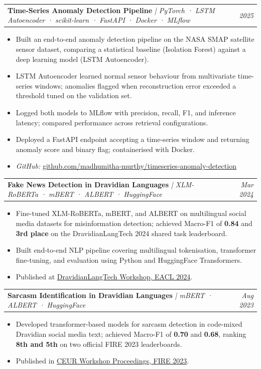 \documentclass[10pt, a4paper]{article}
\makeatletter
\newcommand{\projentry}[3]{%
    \noindent
    \begin{tabularx}{\textwidth}{@{}X r@{}}
        \textbf{#1} \textit{\small | #2} & \textit{#3}
    \end{tabularx}%
    \vspace{1pt}%
}
\newcommand{\entryspace}{\vspace{6pt}}
\makeatother
\begin{document}
\projentry{Time-Series Anomaly Detection Pipeline}{PyTorch · LSTM Autoencoder · scikit-learn · FastAPI · Docker · MLflow}{2025}
\begin{itemize}
    \item Built an end-to-end anomaly detection pipeline on the NASA SMAP satellite sensor dataset, comparing a statistical baseline (Isolation Forest) against a deep learning model (LSTM Autoencoder).
    \item LSTM Autoencoder learned normal sensor behaviour from multivariate time-series windows; anomalies flagged when reconstruction error exceeded a threshold tuned on the validation set.
    \item Logged both models to MLflow with precision, recall, F1, and inference latency; compared performance across retrieval configurations.
    \item Deployed a FastAPI endpoint accepting a time-series window and returning anomaly score and binary flag; containerised with Docker.
    \item \textit{GitHub:} \href{https://github.com/madhumitha-murthy/timeseries-anomaly-detection}{github.com/madhumitha-murthy/timeseries-anomaly-detection}
\end{itemize}

\entryspace

\projentry{Fake News Detection in Dravidian Languages}{XLM-RoBERTa · mBERT · ALBERT · HuggingFace}{Mar 2024}
\begin{itemize}
    \item Fine-tuned XLM-RoBERTa, mBERT, and ALBERT on multilingual social media datasets for misinformation detection; achieved Macro-F1 of \textbf{0.84} and \textbf{3rd place} on the DravidianLangTech 2024 shared task leaderboard.
    \item Built end-to-end NLP pipeline covering multilingual tokenisation, transformer fine-tuning, and evaluation using Python and HuggingFace Transformers.
    \item Published at \href{https://aclanthology.org/2024.dravidianlangtech-1.0}{DravidianLangTech Workshop, EACL 2024}.
\end{itemize}

\entryspace

\projentry{Sarcasm Identification in Dravidian Languages}{mBERT · ALBERT · HuggingFace}{Aug 2023}
\begin{itemize}
    \item Developed transformer-based models for sarcasm detection in code-mixed Dravidian social media text; achieved Macro-F1 of \textbf{0.70} and \textbf{0.68}, ranking \textbf{8th and 5th} on two official FIRE 2023 leaderboards.
    \item Published in \href{https://ceur-ws.org}{CEUR Workshop Proceedings, FIRE 2023}.
\end{itemize}
\end{document}
